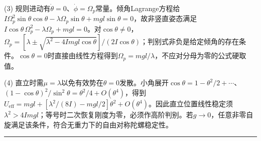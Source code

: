 \documentclass[UTF8,a4paper,11pt,oneside,openany]{ctexbook}
\begin{document}
\par\smallskip\noindent (3) 规则进动有$\dot\theta=0$、$\dot\phi=\Omega_p$常量。倾角Lagrange方程给$I\Omega_p^2\sin\theta\cos\theta-\lambda\Omega_p\sin\theta+mgl\sin\theta=0$，故非竖直姿态满足$I\cos\theta\,\Omega_p^2-\lambda\Omega_p+mgl=0$。对$\cos\theta\ne0$，$\Omega_p=[\lambda\pm\sqrt{\lambda^2-4Imgl\cos\theta}]/(2I\cos\theta)$；判别式非负是给定倾角的存在条件。$\cos\theta=0$时直接由线性方程得到$\Omega_p=mgl/\lambda$，不应对分母为零的公式硬取值。
\par\smallskip\noindent (4) 直立时需$\mu=\lambda$以免有效势在$\theta=0$发散。小角展开$\cos\theta=1-\theta^2/2+\cdots$、$(1-\cos\theta)^2/\sin^2\theta=\theta^2/4+O(\theta^4)$，得到$U_{\mathrm{eff}}=mgl+[\lambda^2/(8I)-mgl/2]\theta^2+O(\theta^4)$。因此直立位置线性稳定须$\lambda^2>4Imgl$；等号时二次恢复刚度为零，必须作高阶判别。若$g\to0$，任意非零自旋满足该条件，符合无重力下的自由对称陀螺稳定性。
\par\medskip\hrule\medskip
\end{document}
